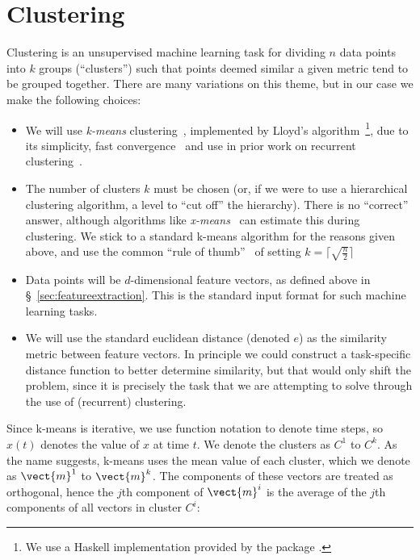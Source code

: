 \section{Clustering}
\label{sec:clustering}

Clustering is an unsupervised machine learning task for dividing $n$ data points
into $k$ groups (``clusters'') such that points deemed similar a given metric
tend to be grouped together. There are many variations on this theme, but in our
case we make the following choices:

\begin{itemize}
\item We will use \emph{k-means} clustering~\cite{macqueen1967some}, implemented
  by Lloyd's algorithm~\cite{lloyd1982least}\footnote{We use a Haskell
    implementation provided by the package .}, due to its
  simplicity, fast convergence~\cite{bottou1994convergence} and use in prior
  work on recurrent clustering~\cite{journals/corr/abs-1212-3618}.
\item The number of clusters $k$ must be chosen (or, if we were to use a
  hierarchical clustering algorithm, a level to ``cut off'' the hierarchy).
  There is no ``correct'' answer, although algorithms like
  \emph{x-means}~\cite{pelleg2000x} can estimate this during clustering. We
  stick to a standard k-means algorithm for the reasons given above, and use
  the common ``rule of thumb''~\cite[pp. 365]{mardia1979multivariate} of setting
  $k = \lceil \sqrt{\frac{n}{2}} \rceil$
\item Data points will be $d$-dimensional feature vectors, as defined above in
  \S~\ref{sec:featureextraction}. This is the standard input format for such
  machine learning tasks.
\item We will use the standard euclidean distance (denoted $e$) as the
  similarity metric between feature vectors. In principle we could construct a
  task-specific distance function to better determine similarity, but that would
  only shift the problem, since it is precisely the task that we are attempting
  to solve through the use of (recurrent) clustering.
\end{itemize}

Since k-means is iterative, we use function notation to denote time steps, so
$x(t)$ denotes the value of $x$ at time $t$. We denote the clusters as $C^1$
to $C^k$. As the name suggests, k-means uses the mean value of each cluster,
which we denote as $\vect{m}^1$ to $\vect{m}^k$. The components of these vectors
are treated as orthogonal, hence the $j$th component of $\vect{m}^i$ is the
average of the $j$th components of all vectors in cluster $C^i$:

